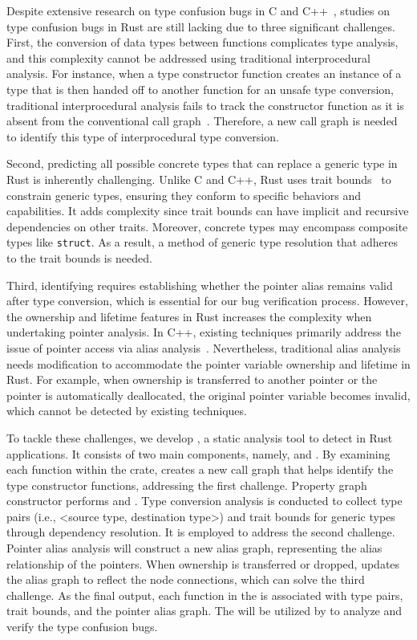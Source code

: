 Despite extensive research on type confusion bugs in C and C++~\cite{jeon2017hextype, haller2016typesan, duck2018effectivesan, lee2015type}, studies on type confusion bugs in Rust are still lacking due to three significant challenges. First, the conversion of data types between functions complicates type analysis, and this complexity cannot be addressed using traditional interprocedural analysis. For instance, when a type constructor function creates an instance of a type that is then handed off to another function for an unsafe type conversion, traditional interprocedural analysis fails to track the constructor function as it is absent from the conventional call graph~\cite{rupta}. Therefore, a new call graph is needed to identify this type of interprocedural type conversion.

{Second, predicting all possible concrete types that can replace a generic type in Rust is inherently challenging. Unlike C and C++, Rust uses trait bounds~\cite{Traitand70:online} to constrain generic types, ensuring they conform to specific behaviors and capabilities. It adds complexity since trait bounds can have implicit and recursive dependencies on other traits. Moreover, concrete types may encompass composite types like \texttt{struct}. As a result, a method of generic type resolution that adheres to the trait bounds is needed.}

Third, identifying \bugs requires establishing whether the pointer alias remains valid after type conversion, which is essential for our bug verification process. However, the ownership and lifetime features in Rust increases the complexity when undertaking pointer analysis. In C++, existing techniques primarily address the issue of pointer access via alias analysis~\cite{10.1145/3503222.3507770, 10301168, fan2020accelerating}. Nevertheless, traditional alias analysis needs modification to accommodate the pointer variable ownership and lifetime in Rust. For example, when ownership is transferred to another pointer or the pointer is automatically deallocated, the original pointer variable becomes invalid,
which cannot be detected by existing techniques.

To tackle these challenges, we develop \TN, a static analysis tool to detect \bugs in Rust applications. It consists of two main components, namely, \Tyanalyzer and \Bugdetector. By examining each function within the crate, \tyanalyzer creates a new call graph that helps identify the type constructor functions, addressing the first challenge. Property graph constructor performs \analysisone and \analysistwo. Type conversion analysis is conducted to collect type pairs (i.e., $\text{<}$source type, destination type$\text{>}$) and trait bounds for generic types through dependency resolution. It is employed to address the second challenge. Pointer alias analysis will construct a new alias graph, representing the alias relationship of the pointers. When ownership is transferred or dropped, \tyanalyzer updates the alias graph to reflect the node connections, which can solve the third challenge. As the final output, each function in the \pcg is associated with type pairs, trait bounds, and the pointer alias graph. The \pcg will be utilized by \bugdetector to analyze and verify the type confusion bugs.

